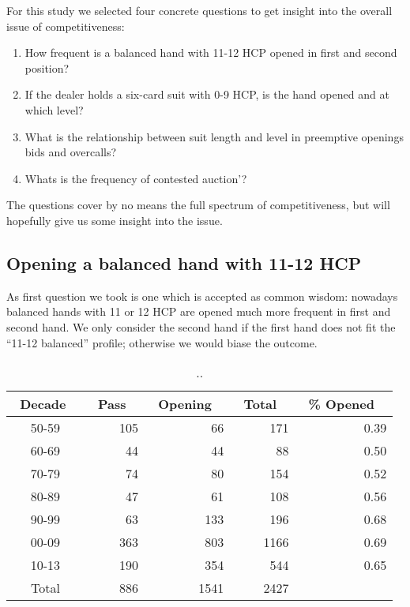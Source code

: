 \documentclass{llncs}
\begin{document}
For this study we selected four concrete questions to get insight into the
overall issue of competitiveness: 
\begin{enumerate}
\item How frequent is a balanced hand with 11-12 HCP opened in first
  and second position?
\item If the dealer holds a six-card suit with 0-9 HCP, is the hand
  opened and at which level? 
\item What is the relationship between suit length and level in
  preemptive openings bids and overcalls? 
\item Whats is the frequency of contested auction'?   
\end{enumerate}

The questions cover by no means the full spectrum of competitiveness,
but will hopefully give us some insight into the issue.   

\subsection{Opening a balanced hand with 11-12 HCP}

As first question we took is one which is accepted as common wisdom:
nowadays balanced hands with 11 or 12 HCP are opened much more frequent
in first and second hand.  We only consider the second hand if the
first hand does not fit the ``11-12 balanced'' profile; otherwise we
would  biase the outcome. 

\begin{table}
\caption{..}
\label{tbl:opening-11-12-bal-2}
\centering\footnotesize
\begin{tabular}{|c|r|r|r|r|}
\hline
\bf \ Decade \ & \bf \ Pass \ & \bf \ Opening \ & \bf \ Total \  & 
\bf \ \% Opened \ \\ \hline 
50-59 & 105 & 66 & 171 & 0.39 \\
60-69 & 44 & 44 & 88 & 0.50 \\
70-79 & 74 & 80 & 154 & 0.52 \\
80-89 & 47 & 61 & 108 & 0.56 \\
90-99 & 63 & 133 & 196 & 0.68 \\
00-09 & 363 & 803 & 1166 & 0.69 \\
10-13 & 190 & 354 & 544 & 0.65 \\ 
Total & 886 & 1541 & 2427 & \\
\hline
\end{tabular}
\end{table}
\end{document}
